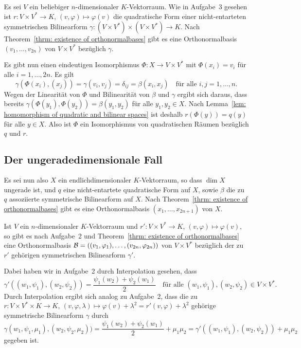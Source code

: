 \documentclass[a4paper,10pt,numbers=noenddot]{scrartcl}
\begin{document}
Es sei $V$ ein beliebiger $n$-dimensionaler $K$-Vektorraum.
Wie in Aufgabe~3 gesehen ist $r \colon V \times V^* \to K$, $(v,\varphi) \mapsto \varphi(v)$ die quadratische Form einer nicht-entarteten symmetrischen Bilinearform $\gamma \colon (V \times V^*) \times (V \times V^*) \to K$.
Nach Theorem~\ref{thrm: existence of orthonormalbases} gibt es eine Orthonormalbasis $(v_1, \dotsc, v_{2n})$ von $V \times V^*$ bezüglich $\gamma$.

Es gibt nun einen eindeutigen Isomorphismus $\Phi \colon X \to V \times V^*$ mit $\Phi(x_i) = v_i$ für alle $i = 1, \dotsc, 2n$.
Es gilt
\[
  \gamma(\Phi(x_i), (x_j)) = \gamma(v_i, v_j) = \delta_{ij} = \beta(x_i, x_j)
  \quad
  \text{für alle $i, j = 1, \dotsc, n$}.
\]
Wegen der Linearität von $\Phi$ und Bilinearität von $\beta$ und $\gamma$ ergibt sich daraus, dass bereits $\gamma(\Phi(y_1), \Phi(y_2)) = \beta(y_1, y_2)$ für alle $y_1, y_2 \in X$.
Nach Lemma~\ref{lem: homomorphism of quadratic and bilinear spaces} ist deshalb $r(\Phi(y)) = q(y)$ für alle $y \in X$.
Also ist $\Phi$ ein Isomorphismus von quadratischen Räumen bezüglich $q$ und $r$.





\subsection{Der ungeradedimensionale Fall}

Es sei nun also $X$ ein endlichdimensionaler $K$-Vektorraum, so dass $\dim X$ ungerade ist, und $q$ eine nicht-entartete quadratische Form auf $X$, sowie $\beta$ die zu $q$ assoziierte symmetrische Bilinearform auf $X$.
Nach Theorem~\ref{thrm: existence of orthonormalbases} gibt es eine Orthonormalbasis $(x_1, \dotsc, x_{2n+1})$ von $X$.

Ist $V$ ein $n$-dimensionaler $K$-Vektorraum und $r' \colon V \times V^* \to K$, $(v, \varphi) \mapsto \varphi(v)$, so gibt es nach Aufgabe~2 und Theorem~\ref{thrm: existence of orthonormalbases} eine Orthonormalbasis $\mathcal{B} = ((v_1, \varphi_1), \dotsc, (v_{2n}, \varphi_{2n}))$ von $V \times V^*$ bezüglich der zu $r'$ gehörigen symmetrischen Bilinearform $\gamma'$.

Dabei haben wir in Aufgabe~2 durch Interpolation gesehen, dass
\[
    \gamma'((w_1, \psi_1), (w_2, \psi_2))
  = \frac{\psi_1(w_2) + \psi_2(w_1)}{2}
  \quad
  \text{für alle $(w_1, \psi_1), (w_2, \psi_2) \in V \times V^*$}.
\]
Durch Interpolation ergibt sich analog zu Aufgabe~2, dass die zu $r \colon V \times V^* \times K \to K$, $(v, \varphi, \lambda) \mapsto \varphi(v) + \lambda^2 = r'(v, \varphi) + \lambda^2$ gehörige symmetrische Bilinearform $\gamma$ durch
\[
    \gamma(w_1, \psi_1, \mu_1), (w_2, \psi_2, \mu_2))
  = \frac{\psi_1(w_2) + \psi_2(w_1)}{2} + \mu_1 \mu_2
  = \gamma'((w_1, \psi_1), (w_2, \psi_2)) + \mu_1 \mu_2
\]
gegeben ist.
\end{document}

